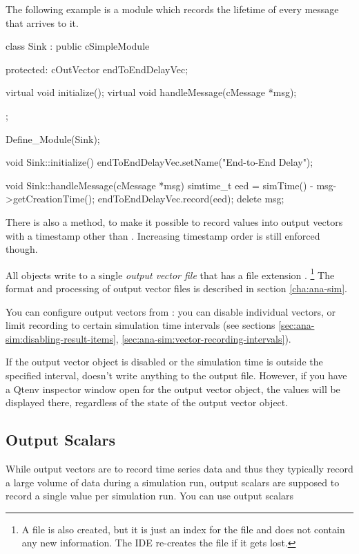 The following example is a  module which records the lifetime
of every message that arrives to it.

\begin{cpp}
class Sink : public cSimpleModule
{
  protected:
    cOutVector endToEndDelayVec;

    virtual void initialize();
    virtual void handleMessage(cMessage *msg);
};

Define_Module(Sink);

void Sink::initialize()
{
    endToEndDelayVec.setName("End-to-End Delay");
}

void Sink::handleMessage(cMessage *msg)
{
    simtime_t eed = simTime() - msg->getCreationTime();
    endToEndDelayVec.record(eed);
    delete msg;
}
\end{cpp}

There is also a  method, to make it
possible to record values into output vectors with a timestamp other than
. Increasing timestamp order is still enforced though.

All  objects write to a single \textit{output vector file}
that has a file extension .
  \footnote{A  file is also created, but it is just an index for
  the  file and does not contain any new information. The IDE
  re-creates the  file if it gets lost.}
The format and processing of output vector files is described in section
\ref{cha:ana-sim}.

You can configure output vectors from :
you can disable individual vectors, or limit recording to certain
simulation time intervals (see sections
\ref{sec:ana-sim:disabling-result-items},
\ref{sec:ana-sim:vector-recording-intervals}).

If the output vector object is disabled or the simulation time is
outside the specified interval,  doesn't write
anything to the output file. However, if you have a Qtenv inspector
window open for the output vector object,
the values will be displayed there, regardless of the state of the
output vector object.



\subsection{Output Scalars}
\label{sec:sim-lib:output-scalars}

While output vectors are to record time series data and thus they
typically record a large volume of data during a simulation run,
output scalars are supposed to record a single
value per simulation run. You can use output scalars

